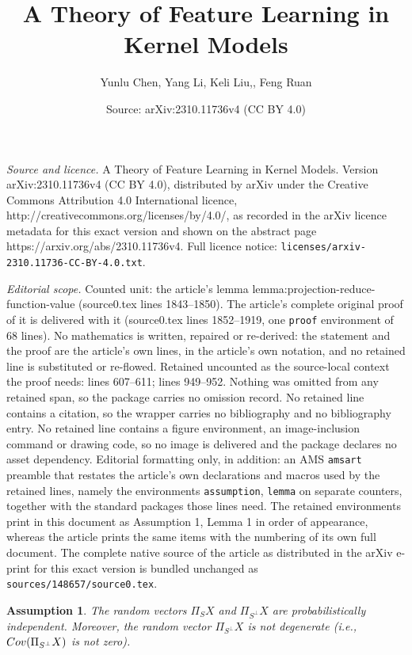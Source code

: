 \documentclass[10pt,a4paper]{amsart}
\title{A Theory of Feature Learning in Kernel Models}
\author{Yunlu Chen, Yang Li, Keli Liu,, Feng Ruan}
\date{Source: arXiv:2310.11736v4 (CC BY 4.0)}
\newtheorem{assumption}{Assumption}
\newcommand{\Cov}{{\rm Cov}}
\begin{document}
\maketitle

\noindent\emph{Source and licence.} A Theory of Feature Learning in Kernel Models. Version arXiv:2310.11736v4 (CC BY 4.0), distributed by arXiv under the Creative Commons Attribution 4.0 International licence, http://creativecommons.org/licenses/by/4.0/, as recorded in the arXiv licence metadata for this exact version and shown on the abstract page https://arxiv.org/abs/2310.11736v4. Full licence notice: \texttt{licenses/arxiv-2310.11736-CC-BY-4.0.txt}.\par\smallskip

\noindent\textit{Editorial scope.} Counted unit: the article's lemma lemma:projection-reduce-function-value (source0.tex lines 1843--1850). The article's complete original proof of it is delivered with it (source0.tex lines 1852--1919, one \texttt{proof} environment of 68 lines). No mathematics is written, repaired or re-derived: the statement and the proof are the article's own lines, in the article's own notation, and no retained line is substituted or re-flowed.  Retained uncounted as the source-local context the proof needs: lines 607--611; lines 949--952.  Nothing was omitted from any retained span, so the package carries no omission record.  No retained line contains a citation, so the wrapper carries no bibliography and no bibliography entry.  No retained line contains a figure environment, an image-inclusion command or drawing code, so no image is delivered and the package declares no asset dependency.  Editorial formatting only, in addition: an AMS \texttt{amsart} preamble that restates the article's own declarations and macros used by the retained lines, namely the environments \texttt{assumption}, \texttt{lemma} on separate counters, together with the standard packages those lines need.  The retained environments print in this document as Assumption 1, Lemma 1 in order of appearance, whereas the article prints the same items with the numbering of its own full document.  The complete native source of the article as distributed in the arXiv e-print for this exact version is bundled unchanged as \texttt{sources/148657/source0.tex}.
\begin{assumption}
\label{assumption:independence}
The random vectors $\Pi_S X$ and $\Pi_{S^\perp} X$ are probabilistically independent.  
Moreover, the random vector $\Pi_{S^\perp} X$ is not degenerate (i.e., $\Cov(\Pi_{S^\perp} X)$ is not zero). 
\end{assumption} 
\end{document}
